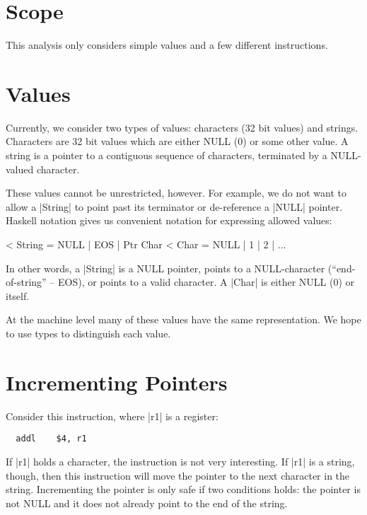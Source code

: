 \documentclass[11pt]{article}
\begin{document}
\doublespacing
{}

\DefineShortVerb{\|%
}

\VerbatimFootnotes
\DefineShortVerb{\#}

\section*{Scope}

This analysis only considers simple values and a few different instructions. 

\section*{Values}

Currently, we consider two types of values: characters (32 bit values)
and strings. Characters are 32 bit values which are either NULL (0) or
some other value. A string is a pointer to a contiguous sequence of
characters, terminated by a NULL-valued character.

These values cannot be unrestricted, however. For example, we do not
want to allow a |String| to point past its terminator or de-reference a
|NULL| pointer. Haskell notation gives us convenient notation for expressing 
allowed values:

< String = NULL | EOS | Ptr Char
< Char = NULL | 1 | 2 | ... 

In other words, a |String| is a NULL pointer, points to a NULL-character (``end-of-string'' -- EOS), or points to a valid character. A |Char| is either NULL (0) or itself.

At the machine level many of these values have the same representation. We hope to use types to distinguish each value.

\section*{Incrementing Pointers}

Consider this instruction, where |r1| is a register:

\begin{verbatim}
  addl    $4, r1
\end{verbatim}

If |r1| holds a character, the instruction is not very interesting. If
|r1| is a string, though, then this instruction will move the pointer
to the next character in the string. Incrementing the pointer is only
safe if two conditions holds: the pointer is not NULL and it does not
already point to the end of the string.
\end{document}
